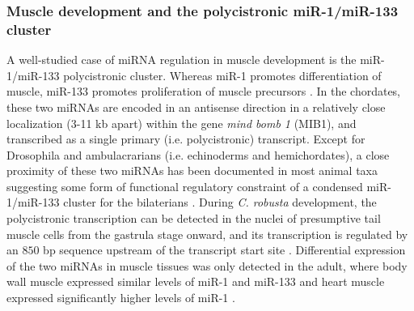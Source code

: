 \documentclass[graybox]{svmult}
\begin{document}
\subsubsection{Muscle development and the polycistronic miR-1/miR-133 cluster}
A well-studied case of miRNA regulation in muscle development is the 
miR-1/miR-133 polycistronic cluster. Whereas miR-1 promotes differentiation of 
muscle, miR-133 promotes proliferation of muscle precursors \citep{Chen:2005yq}. 
In the chordates, these two miRNAs are encoded in an antisense direction in a 
relatively close localization (3-11 kb apart) within the gene \textit{mind bomb 
1} (MIB1), and transcribed as a single primary (i.e. polycistronic) transcript. 
Except for Drosophila and ambulacrarians (i.e. echinoderms and hemichordates), 
a close proximity of these two miRNAs has been documented in most animal taxa 
suggesting some form of functional regulatory constraint of a condensed 
miR-1/miR-133 cluster for the bilaterians \citep{Campo-Paysaa:2011}. 
During \textit{C. robusta} development, the polycistronic transcription can be 
detected in the nuclei of presumptive tail muscle cells from the gastrula stage 
onward, and its transcription is regulated by an $850$ bp sequence upstream of 
the transcript start site \citep{Kusakabe2013}. Differential 
expression of the two miRNAs in muscle tissues was only detected in the adult, 
where body wall muscle expressed similar levels of miR-1 and miR-133 and heart 
muscle expressed significantly higher levels of miR-1 \citep{Kusakabe2013}.
\end{document}
